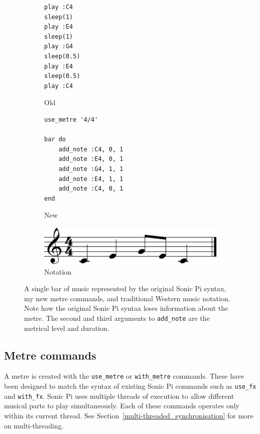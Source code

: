 \documentclass[12pt,twoside,openright]{report}
\begin{document}
\begin{figure}[ht]
    \centering
    \begin{subfigure}[b]{0.2\textwidth}
        \centering
        \begin{verbatim}
play :C4
sleep(1)
play :E4
sleep(1)
play :G4
sleep(0.5)
play :E4
sleep(0.5)
play :C4
        \end{verbatim}
        \caption{Old}
    \end{subfigure}
    \begin{subfigure}[b]{0.4\textwidth}
        \centering
        \begin{verbatim}
use_metre '4/4'

bar do
    add_note :C4, 0, 1
    add_note :E4, 0, 1
    add_note :G4, 1, 1
    add_note :E4, 1, 1
    add_note :C4, 0, 1
end
        \end{verbatim}
        \caption{New}
    \end{subfigure}
    \begin{subfigure}[b]{0.3\textwidth}
        \centering
        \includegraphics[width=\linewidth]{figures/sonic_pi_comparison.pdf}
        \caption{Notation}
    \end{subfigure}
    \cprotect\caption{A single bar of music represented by the original Sonic Pi syntax, my new metre commands, and traditional Western music notation. Note how the original Sonic Pi syntax loses information about the metre. The second and third arguments to \verb'add_note' are the metrical level and duration.}
    \label{fig:sonicpi_language_comparison}
\end{figure}


\subsection{Metre commands} \label{metre_commands}

A metre is created with the \verb'use_metre' or \verb'with_metre' commands. These have been
designed to match the syntax of existing Sonic Pi commands such as \verb'use_fx' and \verb'with_fx'. Sonic Pi uses multiple threads of execution to allow different musical parts to play simultaneously. Each of these commands operates only within its current thread. See Section~\ref{multi-threaded_synchronisation} for more on multi-threading.
\end{document}

